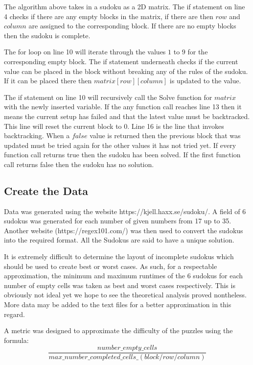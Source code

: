 \documentclass{article}
\begin{document}
The algorithm above takes in a sudoku as a 2D matrix. The if statement on line 4 checks if there are any empty blocks in the matrix, if there are then $row$ and $column$ are assigned to the corresponding block. If there are no empty blocks then the sudoku is complete. 

The for loop on line 10 will iterate through the values $1$ to $9$ for the corresponding empty block. The if statement underneath checks if the current value can be placed in the block without breaking any of the rules of the sudoku. If it can be placed there then $matrix[row][column]$ is updated to the value.

The if statement on line 10 will recursively call the Solve function for $matrix$ with the newly inserted variable.
If the any function call reaches line 13 then it means the current setup has failed and that the latest value must be backtracked. This line will reset the current block to 0. Line 16 is the line that invokes backtracking. When a $false$ value is returned then the previous block that was updated must be tried again for the other values it has not tried yet. If every function call returns true then the sudoku has been solved. If the first function call returns false then the sudoku has no solution.

\newpage

\subsection{Create the Data}
Data was generated using the website https://kjell.haxx.se/sudoku/. A field of 6 sudokus was generated for each number of given numbers from 17 up to 35. Another website (https://regex101.com/) was then used to convert the sudokus into the required format. All the Sudokus are said to have a unique solution.

It is extremely difficult to determine the layout of incomplete sudokus which should be used to create best or worst cases. As such, for a respectable approximation, the minimum and maximum runtimes of the 6 sudokus for each number of empty cells was taken as best and worst cases respectively. This is obviously not ideal yet we hope to see the theoretical analysis proved nontheless. More data may be added to the text files for a better approximation in this regard.

A metric was designed to approximate the difficulty of the puzzles using the formula: \[\frac{number\_empty\_cells}{max\_number\_completed\_cells\_(block/row/column)}\]
\end{document}
